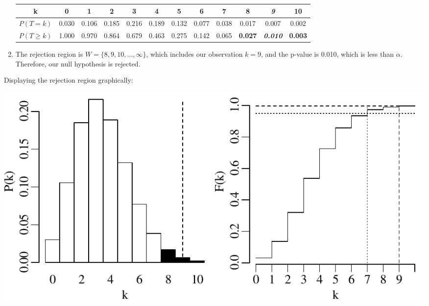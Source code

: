 \begin{enumerate}
  \begin{tabular}{c@{~}c@{~}c@{~}c@{~}c@{~}c@{~}c@{~}c@{~}c@{~}c@{~}c@{~}c}
    k & 0 & 1 & 2 & 3 & 4 & 5 & 6 & 7 & \textbf{8} &
    \textbf{\textit{9}} & \textbf{10} \\ \hline
    $P(T=k)$ & 0.030 & 0.106 & 0.185 & 0.216 & 0.189 &
    0.132 & 0.077 & 0.038 & 0.017 & 0.007 & 0.002 \\
    $P({T}\geq{k})$ & 1.000 & 0.970 & 0.864 & 0.679 & 0.463 &
    0.275 & 0.142 & 0.065 & \textbf{0.027} & \textbf{\textit{0.010}} &
    \textbf{0.003} \\
  \end{tabular}

\item\label{it:poisl351sided} The rejection region is $W =
  \{8,9,10,\ldots,\infty\}$, which includes our observation $k=9$,
  and the p-value is 0.010, which is less than $\alpha$. Therefore,
  our null hypothesis is rejected.

\end{enumerate}

Displaying the rejection region graphically:

\noindent\begin{minipage}[t][][b]{.6\textwidth}
  \includegraphics[width=\textwidth]{../figures/poishyp.pdf}\\
\end{minipage}
\begin{minipage}[t][][t]{.4\textwidth}
  \label{fig:poishyp}
\end{minipage}

